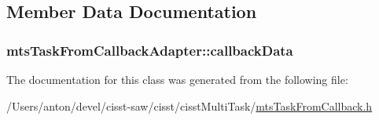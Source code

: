 \subsection{Member Data Documentation}
\hypertarget{classmts_task_from_callback_adapter_aa7f1cc998e5366d8c3eebc802f9d7652}{}
\subsubsection[{callback\+Data}]{ mts\+Task\+From\+Callback\+Adapter\+::callback\+Data\hspace{0.3cm}{\ttfamily [protected]}}\label{classmts_task_from_callback_adapter_aa7f1cc998e5366d8c3eebc802f9d7652}


The documentation for this class was generated from the following file\+:\begin{DoxyCompactItemize}
\item 
/\+Users/anton/devel/cisst-\/saw/cisst/cisst\+Multi\+Task/\hyperlink{mts_task_from_callback_8h}{mts\+Task\+From\+Callback.\+h}\end{DoxyCompactItemize}
